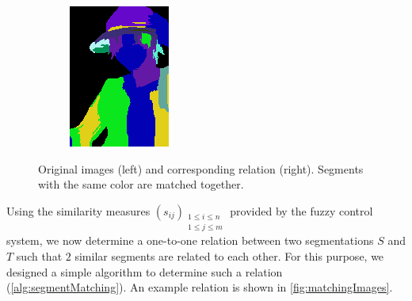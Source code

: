\begin{figure}[htb!]
\begin{subfigure}{0.24\textwidth}
\includegraphics[width=\textwidth]{images/luffy_match2.png}
\end{subfigure}
\caption{Original images (left) and corresponding relation (right). Segments with the same color are matched together.}
\label{fig:matchingImages}
\end{figure}

Using the similarity measures $(s_{ij})_{\substack{1 \leq i \leq n\\ 1 \leq j \leq m}}$ provided by the fuzzy control system, we now determine a one-to-one relation between two segmentations $S$ and $T$ such that $2$ similar segments are related to each other. For this purpose, we designed a simple algorithm to determine such a relation (\autoref{alg:segmentMatching}). An example relation is shown in \autoref{fig:matchingImages}.

